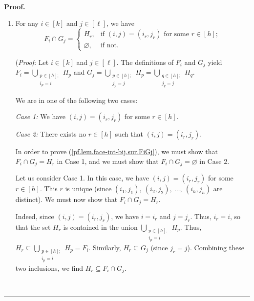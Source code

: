 \documentclass[12pt]{article}
\theoremstyle{definition}%
\theoremstyle{definition}%
\theoremstyle{remark}%
\newcommand{\interval}[1]{\left[ #1 \right]} %
\newenvironment{proof}[1][Proof]{\noindent\textbf{#1.} }{\ \rule{0.5em}{0.5em}}
\begin{document}
\begin{proof}
\begin{enumerate}
\item For any $i\in\interval{k}  $ and $j\in\interval{\ell}$, we
have
\begin{equation}
F_{i}\cap G_{j}=
\begin{cases}
H_{r}, & \text{if }\left(  i,j\right)  =\left(  i_{r},j_{r}\right)  \text{ for
some }r\in\interval{h} ;\\
\varnothing, & \text{if not.}
\end{cases}
\label{pf.lem.face-int-bij.sur.FiGj}
\end{equation}


(\textit{Proof:} Let $i\in\interval{k}  $ and $j\in\interval{\ell}$.
The definitions of $F_{i}$ and $G_{j}$ yield $F_{i}=\bigcup
\limits_{\substack{p\in\interval{h} ;\\i_{p}=i}}H_{p}$ and $G_{j}
=\bigcup\limits_{\substack{p\in\interval{h} ;\\j_{p}=j}}H_{p}
=\bigcup\limits_{\substack{q\in\interval{h} ;\\j_{q}=j}}H_{q}$.

We are in one of the following two cases:

\textit{Case 1:} We have $\left(  i,j\right)  =\left(  i_{r},j_{r}\right)  $
for some $r\in\interval{h} $.

\textit{Case 2:} There exists no $r\in\interval{h} $ such that $\left(
i,j\right)  =\left(  i_{r},j_{r}\right)  $.

In order to prove (\ref{pf.lem.face-int-bij.sur.FiGj}), we must show that
$F_{i}\cap G_{j}=H_{r}$ in Case 1, and we must show that $F_{i}\cap
G_{j}=\varnothing$ in Case 2.

Let us consider Case 1. In this case, we have $\left(  i,j\right)  =\left(
i_{r},j_{r}\right)  $ for some $r\in\interval{h} $. This $r$ is unique
(since $\left(  i_{1},j_{1}\right)  ,\ \left(  i_{2},j_{2}\right)
,\ \ldots,\ \left(  i_{h},j_{h}\right)  $ are distinct). We must now show that
$F_{i}\cap G_{j}=H_{r}$.

Indeed, since $\left(  i,j\right)  =\left(  i_{r},j_{r}\right)  $, we have
$i=i_{r}$ and $j=j_{r}$. Thus, $i_{r}=i$, so that the set $H_{r}$ is contained
in the union $\bigcup\limits_{\substack{p\in\interval{h} ;\\i_{p}
=i}}H_{p}$. Thus, $H_{r}\subseteq\bigcup\limits_{\substack{p\in
\interval{h};\\i_{p}=i}}H_{p}=F_{i}$. Similarly, $H_{r}\subseteq G_{j}$ (since
$j_{r}=j$). Combining these two inclusions, we find $H_{r}\subseteq F_{i}\cap
G_{j}$.


\end{enumerate}
\end{proof}
\end{document}
